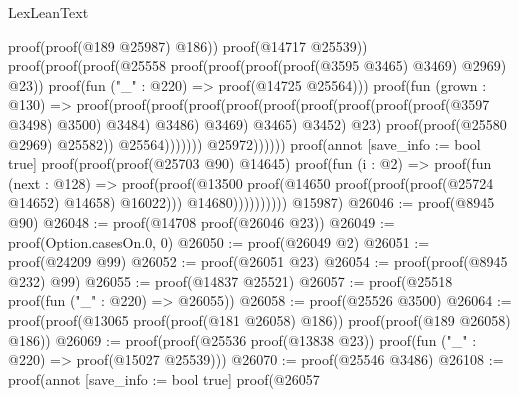 \begin{lexlean}{LexLeanText}
\begin{coremodule}
                                                  proof(proof(@189 @25987) @186))
                                                proof(@14717 @25539))
                                              proof(proof(proof(@25558
                                                      proof(proof(proof(proof(@3595 @3465) @3469)
                                                            @2969)
                                                          @23))
                                                    proof(fun ("_" : @220) => proof(@14725 @25564)))
                                                  proof(fun (grown : @130) =>
                                                    proof(proof(proof(proof(proof(proof(proof(proof(proof(proof(@3597
                                                                          @3498)
                                                                        @3500)
                                                                      @3484)
                                                                    @3486)
                                                                  @3469)
                                                                @3465)
                                                              @3452)
                                                            @23)
                                                          proof(proof(@25580 @2969) @25582))
                                                        @25564)))))))
                                  @25972))))))
                  proof(annot [save_info := bool true]
                    proof(proof(proof(@25703 @90) @14645)
                        proof(fun (i : @2) =>
                          proof(fun (next : @128) =>
                            proof(proof(@13500
                                  proof(@14650 proof(proof(proof(@25724 @14652) @14658) @16022)))
                                @14680))))))))))
      @15987)
@26046 := proof(@8945 @90)
@26048 := proof(@14708 proof(@26046 @23))
@26049 := proof(Option.casesOn.{0, 0})
@26050 := proof(@26049 @2)
@26051 := proof(@24209 @99)
@26052 := proof(@26051 @23)
@26054 := proof(proof(@8945 @232) @99)
@26055 := proof(@14837 @25521)
@26057 := proof(@25518 proof(fun ("_" : @220) => @26055))
@26058 := proof(@25526 @3500)
@26064 := proof(proof(@13065 proof(proof(@181 @26058) @186)) proof(proof(@189 @26058) @186))
@26069 := proof(proof(@25536 proof(@13838 @23)) proof(fun ("_" : @220) => proof(@15027 @25539)))
@26070 := proof(@25546 @3486)
@26108 := proof(annot [save_info := bool true]
    proof(@26057

\end{coremodule}
\end{lexlean}
